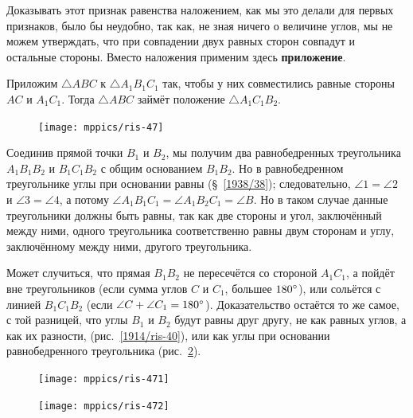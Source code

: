 \documentclass[oneside]{book}
\begin{document}
Доказывать этот признак равенства наложением, как мы это делали для первых признаков, было бы неудобно, так как, не зная ничего о величине углов, мы не можем утверждать, что при совпадении двух равных сторон совпадут и остальные стороны.
Вместо наложения применим здесь \textbf{приложение}.

Приложим $\triangle ABC$ к $\triangle A_1B_1C_1$ так, чтобы у них совместились равные стороны $AC$ и $A_1C_1$.
Тогда $\triangle ABC$ займёт положение $\triangle A_1C_1B_2$.

\begin{figure}
\centering
\texttt{[image: mppics/ris-47]}
\caption{}\label{1938/ris-47}
\end{figure}

Соединив прямой точки $B_1$ и $B_2$, мы получим два равнобедренных треугольника $A_1B_1B_2$ и $B_1C_1B_2$ с общим основанием $B_1B_2$.
Но в равнобедренном треугольнике углы при основании равны (§~\ref{1938/38});
следовательно, $\angle 1 = \angle 2$ и $\angle 3 = \angle 4$, а потому $\angle A_1B_1C_1 = \angle A_1B_2C_1 = \angle B$.
Но в таком случае данные треугольники должны быть равны, так как две стороны и угол, заключённый между ними, одного треугольника соответственно равны двум сторонам и углу, заключённому между ними, другого треугольника.


Может случиться, что прямая $B_1B_2$ не пересечётся со стороной $A_1C_1$,
а пойдёт вне треугольников (если сумма углов $C$ и $C_1$, большее $180\degree$),
или сольётся с линией $B_1C_1B_2$ (если $\angle C +\angle  C_1 = 180\degree$). Доказательство остаётся то же самое, с той разницей, что углы $B_1$ и $B_2$
будут равны друг другу, не как  равных углов, а как их разности, (рис.~\ref{1914/ris-40}), или как углы при основании равнобедренного треугольника (рис.~\ref{1914/ris-41}).

\begin{figure}[h!]
\begin{minipage}{.48\textwidth}
\centering
\texttt{[image: mppics/ris-471]}
\caption{}\label{1914/ris-40}
\end{minipage}\hfill
\begin{minipage}{.48\textwidth}
\centering
\texttt{[image: mppics/ris-472]}
\caption{}\label{1914/ris-41}
\end{minipage}
\end{figure}
\end{document}
